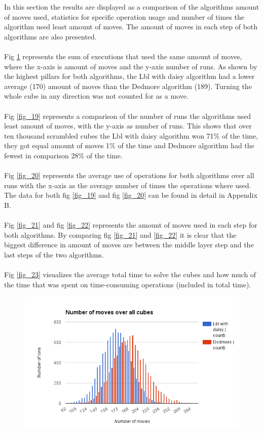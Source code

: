 \documentclass[a4paper,11pt]{kth-mag}
\begin{document}
In this section the results are displayed as a comparison of the algorithms amount of moves used, statistics for specific operation usage and number of times the algorithm used least amount of moves. The amount of moves in each step of both algorithms are also presented.\\\\ 
Fig \ref{fig_18} represents the sum of executions that used the same amount of moves, where the x-axis is amount of moves and the y-axis number of runs.
As shown by the highest pillars for both algorithms, the Lbl with daisy algorithm had a lower average (170) amount of moves than the Dedmore algorithm (189). Turning the whole cube in any direction was not counted for as a move.\\\\
Fig \ref{fig_19} represents a comparison of the number of runs the algorithms used least amount of moves, with the y-axis as number of runs. 
This shows that over ten thousand scrambled cubes the Lbl with daisy algorithm won 71\% of the time, they got equal amount of moves 1\% of the time and Dedmore algorithm had the fewest in comparison 28\% of the time.\\\\
Fig \ref{fig_20} represents the average use of operations for both algorithms over all runs with the x-axis as the average number of times the operations where used. \\The data for both fig \ref{fig_19} and fig \ref{fig_20} can be found in detail in Appendix B.\\\\ 
Fig \ref{fig_21} and fig \ref{fig_22} represents the amount of moves used in each step for both algorithms. By comparing fig \ref{fig_21} and \ref{fig_22} it is clear that the biggest difference in amount of moves are between the middle layer step and the last steps of the two algorithms.\\\\
Fig \ref{fig_23} visualizes the average total time to solve the cubes and how much of the time that was spent on time-consuming operations (included in total time). 
\begin{figure}[h!]
	\centering
	\includegraphics[width= 1.1\textwidth]{figs/graphone.png}
	\caption{}
	\label{fig_18}
\end{figure}
\end{document}
